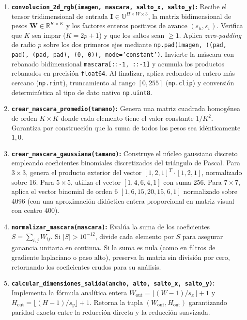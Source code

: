 \documentclass[11pt]{article}
\begin{document}
\begin{enumerate}[itemsep=0.3em]
\item \textbf{\texttt{convolucion\_2d\_rgb(imagen, mascara, salto\_x, salto\_y)}:}
Recibe el tensor tridimensional de entrada $\mathbf{I} \in \mathbb{U}^{H \times W \times 3}$, la matriz bidimensional de pesos $\mathbf{W} \in \mathbb{R}^{K \times K}$ y los factores enteros positivos de avance $(s_h, s_v)$. Verifica que $K$ sea impar ($K=2p+1$) y que los saltos sean $\ge 1$. Aplica \textit{zero-padding} de radio $p$ sobre los dos primeros ejes mediante \texttt{np.pad(imagen, ((pad, pad), (pad, pad), (0, 0)), mode='constant')}. Invierte la máscara con rebanado bidimensional \texttt{mascara[::-1, ::-1]} y acumula los productos rebanados en precisión \texttt{float64}. Al finalizar, aplica redondeo al entero más cercano (\texttt{np.rint}), truncamiento al rango $[0, 255]$ (\texttt{np.clip}) y conversión determinística al tipo de dato nativo \texttt{np.uint8}.

\item \textbf{\texttt{crear\_mascara\_promedio(tamano)}:}
Genera una matriz cuadrada homogénea de orden $K \times K$ donde cada elemento tiene el valor constante $1/K^2$. Garantiza por construcción que la suma de todos los pesos sea idénticamente $1,0$.

\item \textbf{\texttt{crear\_mascara\_gaussiana(tamano)}:}
Construye el núcleo gaussiano discreto empleando coeficientes binomiales discretizados del triángulo de Pascal. Para $3\times3$, genera el producto exterior del vector $[1, 2, 1]^T \cdot [1, 2, 1]$, normalizado sobre 16. Para $5\times5$, utiliza el vector $[1, 4, 6, 4, 1]$ con suma 256. Para $7\times7$, aplica el vector binomial de orden 6 $[1, 6, 15, 20, 15, 6, 1]$ normalizado sobre 4096 (con una aproximación didáctica entera proporcional en matriz visual con centro 400).

\item \textbf{\texttt{normalizar\_mascara(mascara)}:}
Evalúa la suma de los coeficientes $S = \sum_{i, j} W_{ij}$. Si $|S| > 10^{-12}$, divide cada elemento por $S$ para asegurar ganancia unitaria en continua. Si la suma es nula (como en filtros de gradiente laplaciano o paso alto), preserva la matriz sin división por cero, retornando los coeficientes crudos para su análisis.

\item \textbf{\texttt{calcular\_dimensiones\_salida(ancho, alto, salto\_x, salto\_y)}:}
Implementa la fórmula analítica entera $W_{\text{out}} = \lfloor (W-1)/s_x \rfloor + 1$ y $H_{\text{out}} = \lfloor (H-1)/s_y \rfloor + 1$. Retorna la tupla $(W_{\text{out}}, H_{\text{out}})$ garantizando paridad exacta entre la reducción directa y la reducción suavizada.


\end{enumerate}
\end{document}
